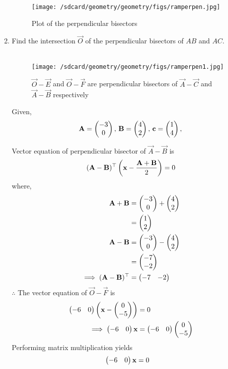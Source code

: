 \documentclass[11pt]{book}
\begin{document}
\begin{enumerate}[label=\thesection.\arabic*.,ref=\thesection.\theenumi]
\begin{figure}[H]
\centering
\texttt{[image: /sdcard/geometry/geometry/figs/ramperpen.jpg]}
\caption{Plot of the perpendicular bisectors}
\label{fig:figure1}
\end{figure}


\item Find the intersection $\vec{O}$ of the perpendicular bisectors of $AB$ and $AC$.
 \\
\solution \\
\begin{figure}[H]
\centering
\texttt{[image: /sdcard/geometry/geometry/figs/ramperpen1.jpg]}
\caption{$\vec{O}-\vec{E}$ and $\vec{O}-\vec{F}$ are perpendicular bisectors of $\vec{A}-\vec{C}$ and $\vec{A}-\vec{B}$ respectively}
\label{fig:Figure_2}
\end{figure}

Given,
\begin{align}
\mathbf{A}=\begin{pmatrix}-3 \\ 0\end{pmatrix},\,
\mathbf{B}=\begin{pmatrix}4\\2\end{pmatrix},\,
	\mathbf{c}=\begin{pmatrix}1\\4\end{pmatrix},\,
\end{align}

Vector equation of perpendicular bisector of $\vec{A}-\vec{B}$ is
\begin{align}
 (\mathbf{A}-\mathbf{B})^\top  \left( \mathbf{x} - \frac{\mathbf{A}+\mathbf{B}}{2}\right) = 0
\end{align}
where,
\begin{align}
\mathbf{A}+\mathbf{B}&=\begin{pmatrix}-3\\0\end{pmatrix}+\begin{pmatrix}4\\2\end{pmatrix}\\
&=\begin{pmatrix}1\\2\end{pmatrix}\\
\mathbf{A}-\mathbf{B} &= \begin{pmatrix}-3\\0\end{pmatrix}-\begin{pmatrix}4\\2\end{pmatrix}\\
&=\begin{pmatrix}-7\\-2\end{pmatrix}\\
\implies (\mathbf{A}-\mathbf{B})^\top &= \begin{pmatrix}-7&-2\end{pmatrix}
\end{align}
$\therefore $ The vector equation of $\vec{O}-\vec{F}$ is
\begin{align}
\begin{pmatrix}-6&0\end{pmatrix} \left( \mathbf{x}-\begin{pmatrix}0\\-5\end{pmatrix} \right)&=0\\
\implies \begin{pmatrix}-6&0\end{pmatrix}\mathbf{x}&=\begin{pmatrix}-6&0\end{pmatrix}\begin{pmatrix}0\\-5\end{pmatrix}
\end{align}
Performing matrix multiplication yields
\begin{align}
\begin{pmatrix}-6&0\end{pmatrix}\mathbf{x}&=0
\end{align}\\


\end{enumerate}
\end{document}
